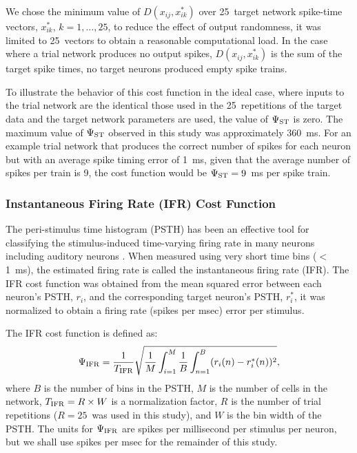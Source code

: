 \smallskip{}

We chose the minimum value of $D(x_{ij} ,x_{ik}^{*} )$ over 25~target
network spike-time vectors, $x_{ik}^{*}$, $k=1,\dots,25$, to reduce
the effect of output randomness, it was limited to 25~vectors to
obtain a reasonable computational load.  In the case where a trial
network produces no output spikes, $D(x_{ij} ,x_{ik}^{*})$ is the sum
of the target spike times, no target neurons produced empty spike
trains.

\smallskip{}

To illustrate the behavior of this cost function in the ideal case,
where {\ANF} inputs to the trial network are the identical those used in
the 25~repetitions of the target data and the target network
parameters are used, the value of $\Psi_{{\rm ST}}$ is zero. The
maximum value of $\Psi_{{\rm ST}}$ observed in this study was
approximately 360~ms.  For an example trial network that produces the
correct number of spikes for each neuron but with an average spike
timing error of 1~ms, given that the average number of spikes per
train is 9, the cost function would be $\Psi_{{\rm ST}}=9$~ms per
spike train.



\subsubsection{Instantaneous Firing Rate (IFR) Cost Function}\label{sec:GA:inst-firing-rate-cost-fn}


The peri-stimulus time histogram (PSTH) has been an effective tool for
classifying the stimulus-induced time-varying firing rate in many
neurons including auditory neurons
\citep{BlackburnSachs:1989,SmithRhode:1989}.  When measured using very
short time bins ($<$1~ms), the estimated firing rate is called the
instantaneous firing rate (IFR).  The IFR cost function was obtained
from the mean squared error between each neuron's PSTH, $r_{i} $, and
the corresponding target neuron's PSTH, $r_{i}^{*} $, it was
normalized to obtain a firing rate (spikes per msec) error per stimulus.

\smallskip{}

The IFR cost function is defined as:
\begin{equation} \label{eq:GA:3} 
\Psi_{{\rm IFR}} =\frac{1}{T_{{\rm IFR}}
  } \sqrt{\frac{1}{M} \int_{i=1}^{M}\frac{1}{B} \int _{n=1}^{B}(r_{i}
    (n)-r_{i}^{*} (n))^{2} },
\end{equation}
\noindent where $B$ is the number of bins in the PSTH, $M$ is the
number of cells in the network, $T_{{\rm IFR}}=R\times W$ is a
normalization factor, $R$ is the number of trial repetitions
($R=25$~was used in this study), and $W$ is the bin width of the
PSTH\@. The units for $\Psi_{{\rm IFR}}$ are spikes per millisecond
per stimulus per neuron, but we shall use spikes per msec for the
remainder of this study.

